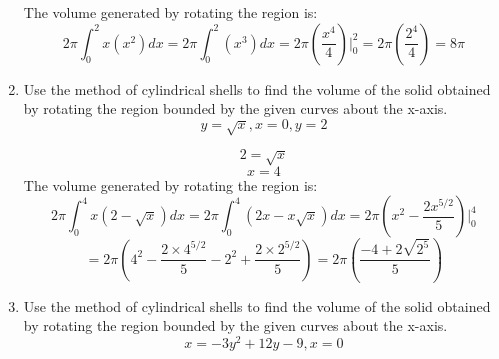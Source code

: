 \documentclass[12pt]{article}
\begin{document}
\begin{enumerate}
\begin{center}
    \end{center}
    The volume generated by rotating the region is:
    \[2\pi\int_{0}^{2} x(x^2)dx = 2\pi\int_{0}^{2} (x^3)dx = 2\pi(\frac{x^4}{4})|_0^2 = 2\pi(\frac{2^4}{4}) = 8\pi\]
\newpage
\setcounter{enumi}{15}
    \item Use the method of cylindrical shells to find the volume of the solid obtained by rotating the region bounded by the given curves about the x-axis.
    \[y=\sqrt{x}, x = 0, y = 2\]
    \begin{center}
    \end{center}
    \[2 = \sqrt{x}\]
    \[x = 4\]
    The volume generated by rotating the region is:
    \[2\pi\int_0^4x(2-\sqrt{x})dx = 2\pi\int_0^4(2x-x\sqrt{x})dx = 2\pi(x^2 - \frac{2x^{5/2}}{5})|_0^4 \]
    \[= 2\pi(4^2 - \frac{2\times4^{5/2}}{5} - 2^2 + \frac{2\times2^{5/2}}{5}) = 2\pi(\frac{-4 + 2\sqrt{2^5}}{5})\]
\setcounter{enumi}{17}
    \item Use the method of cylindrical shells to find the volume of the solid obtained by rotating the region bounded by the given curves about the x-axis.
    \[x = -3y^2 + 12y - 9, x = 0\]
    \begin{center}
\end{center}
\end{enumerate}
\end{document}
